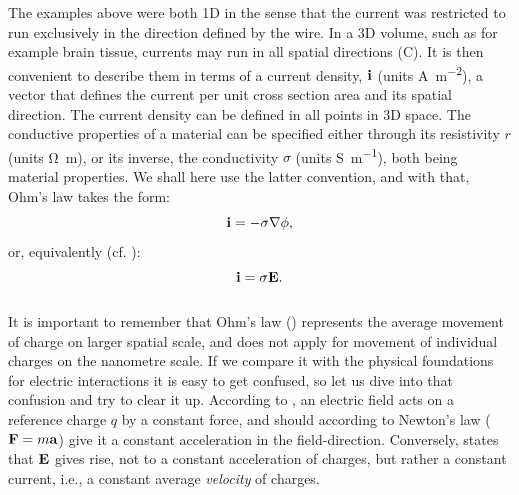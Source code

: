 The examples above were both 1D in the sense that the current was restricted to run exclusively in the direction defined by the wire. In a 3D volume, such as for example brain tissue, currents may run in all spatial directions (C). It is then convenient to describe them in terms of a current density, ${\bf i}$ (units \si{\ampere\per\square\metre}), a vector that defines the current per unit cross section area and its spatial direction. The current density can be defined in all points in 3D space. The conductive properties of a material can be specified either through its resistivity $r$ (units \si{\ohm\metre}), or its inverse, the conductivity $\sigma$ (units \si{\siemens\per\metre}), both being material properties. We shall here use the latter convention, and with that, Ohm's law takes the form:
\begin{equation}
{\bf i} = - \sigma {\bf \nabla} \phi,
\label{eq:Basics:Ohm_3D_phi}
\end{equation}
%
or, equivalently (cf. ):
\begin{equation}
{\bf i} = \sigma {\bf E}.
\label{eq:Basics:Ohm_general}
\end{equation}

\subsubsection{}
\label{sec:Basics:Note}
It is important to remember that Ohm's law () represents the average movement of charge on larger spatial scale, and does not apply for movement of individual charges on the nanometre scale. If we compare it with the physical foundations for electric interactions it is easy to get confused, so let us dive into that confusion and try to clear it up. According to , an electric field acts on a reference charge $q$ by a constant force, and should according to Newton's law (${\bf F} = m{\bf a}$) give it a constant acceleration in the field-direction. Conversely,  states that ${\bf E}$ gives rise, not to a constant acceleration of charges, but rather a constant current, i.e., a constant average \textit{velocity} of charges.

